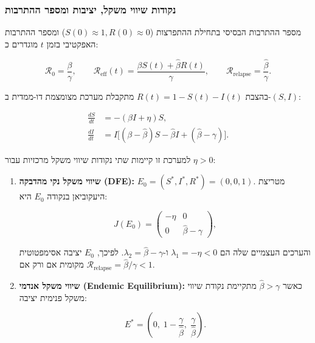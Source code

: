 \subsubsection{נקודות שיווי משקל, יציבות ומספר ההתרבות}
מספר ההתרבות הבסיסי בתחילת ההתפרצות ($S(0) \approx 1, R(0) \approx 0$) ומספר ההתרבות האפקטיבי בזמן $t$ מוגדרים כ:
\begin{english}
\begin{equation}
\mathcal{R}_0 = \frac{\beta}{\gamma}, \qquad
\mathcal{R}_{\text{eff}}(t) = \frac{\beta S(t) + \hat{\beta} R(t)}{\gamma}, \qquad
\mathcal{R}_{\text{relapse}} = \frac{\hat{\beta}}{\gamma}.
\label{eq:siri-r0}
\end{equation}
\end{english}
בהצבת $R(t) = 1 - S(t) - I(t)$ מתקבלת מערכת מצומצמת דו-ממדית ב-$(S,I)$:
\begin{english}
\begin{align}
\frac{dS}{dt} &= -(\beta I + \eta)S, \\
\frac{dI}{dt} &= I\Big[(\beta - \hat{\beta})S - \hat{\beta} I + (\hat{\beta} - \gamma)\Big].
\end{align}
\end{english}
למערכת זו קיימות שתי נקודות שיווי משקל מרכזיות עבור $\eta > 0$:
\begin{enumerate}
    \item \textbf{שיווי משקל נקי מהדבקה (\textenglish{DFE}):} $E_0 = (S^*, I^*, R^*) = (0, 0, 1)$. מטריצת היעקוביאן בנקודה $E_0$ היא:
    \begin{english}
    \begin{equation}
    J(E_0) = \begin{pmatrix} -\eta & 0 \\ 0 & \hat{\beta} - \gamma \end{pmatrix},
    \label{eq:siri-jacobian}
    \end{equation}
    \end{english}
    והערכים העצמיים שלה הם $\lambda_1 = -\eta < 0$ ו-$\lambda_2 = \hat{\beta} - \gamma$. לפיכך, $E_0$ יציבה אסימפטוטית מקומית אם ורק אם $\mathcal{R}_{\text{relapse}} = \hat{\beta}/\gamma < 1$.
    \item \textbf{שיווי משקל אנדמי (\textenglish{Endemic Equilibrium}):} כאשר $\hat{\beta} > \gamma$ מתקיימת נקודת שיווי משקל פנימית יציבה:
    \begin{english}
    \begin{equation}
    E^* = \left(0,\; 1 - \frac{\gamma}{\hat{\beta}},\; \frac{\gamma}{\hat{\beta}}\right).
    \label{eq:siri-endemic}
    \end{equation}
    \end{english}
\end{enumerate}
